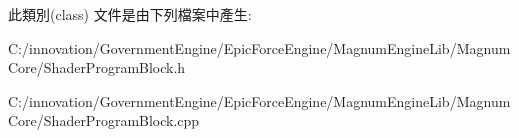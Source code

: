 此類別(class) 文件是由下列檔案中產生\+:\begin{DoxyCompactItemize}
\item 
C\+:/innovation/\+Government\+Engine/\+Epic\+Force\+Engine/\+Magnum\+Engine\+Lib/\+Magnum\+Core/Shader\+Program\+Block.\+h\item 
C\+:/innovation/\+Government\+Engine/\+Epic\+Force\+Engine/\+Magnum\+Engine\+Lib/\+Magnum\+Core/Shader\+Program\+Block.\+cpp\end{DoxyCompactItemize}
